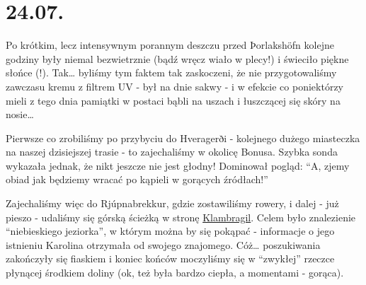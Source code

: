\chapter*{24.07.}

Po krótkim, lecz intensywnym porannym deszczu przed Þorlakshöfn kolejne godziny były niemal bezwietrznie (bądź wręcz wiało w plecy!) i świeciło piękne słońce (!). Tak… byliśmy tym faktem tak zaskoczeni, że nie przygotowaliśmy zawczasu kremu z filtrem UV - był na dnie sakwy - i w efekcie co poniektórzy mieli z tego dnia pamiątki w postaci bąbli na uszach i łuszczącej się skóry na nosie…


Pierwsze co zrobiliśmy po przybyciu do Hveragerði - kolejnego dużego miasteczka na naszej dzisiejszej trasie - to zajechaliśmy w okolicę Bonusa. Szybka sonda wykazała jednak, że nikt jeszcze nie jest głodny! Dominował pogląd: “A, zjemy obiad jak będziemy wracać po kąpieli w gorących źródłach!”

Zajechaliśmy więc do Rjúpnabrekkur, gdzie zostawiliśmy rowery, i dalej - już pieszo - udaliśmy się górską ścieżką w stronę \href{http://www.vulkaner.no/t/isl2004/hot.html}{Klambragil}. Celem było znalezienie “niebieskiego jeziorka”, w którym można by się pokąpać - informacje o jego istnieniu Karolina otrzymała od swojego znajomego. Cóż… poszukiwania zakończyły się fiaskiem i koniec końców moczyliśmy się w “zwykłej” rzeczce płynącej środkiem doliny (ok, też była bardzo ciepła, a momentami - gorąca).


